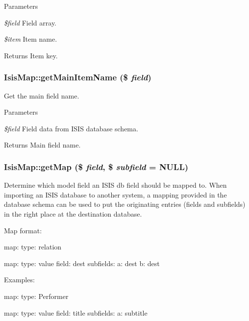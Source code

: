 \begin{DoxyParams}{Parameters}
\item[{\em \$field}]Field array.\item[{\em \$item}]Item name.\end{DoxyParams}
\begin{DoxyReturn}{Returns}
Item key. 
\end{DoxyReturn}
\hypertarget{classIsisMap_af689f27e67b0b38a3e880ead17a487f5}{
\subsubsection[{getMainItemName}]{\setlength{\rightskip}{0pt plus 5cm}IsisMap::getMainItemName (\$ {\em field})}}
\label{classIsisMap_af689f27e67b0b38a3e880ead17a487f5}
Get the main field name.


\begin{DoxyParams}{Parameters}
\item[{\em \$field}]Field data from ISIS database schema.\end{DoxyParams}
\begin{DoxyReturn}{Returns}
Main field name. 
\end{DoxyReturn}
\hypertarget{classIsisMap_a29eb2c45b51f95fdfb9ff7af770ca6ce}{
\subsubsection[{getMap}]{\setlength{\rightskip}{0pt plus 5cm}IsisMap::getMap (\$ {\em field}, \/  \$ {\em subfield} = {\ttfamily NULL})}}
\label{classIsisMap_a29eb2c45b51f95fdfb9ff7af770ca6ce}
Determine which model field an ISIS db field should be mapped to. When importing an ISIS database to another system, a mapping provided in the database schema can be used to put the originating entries (fields and subfields) in the right place at the destination database.

Map format:

map: type: relation

map: type: value field: dest subfields: a: dest b: dest

Examples:

map: type: Performer

map: type: value field: title subfields: a: subtitle


